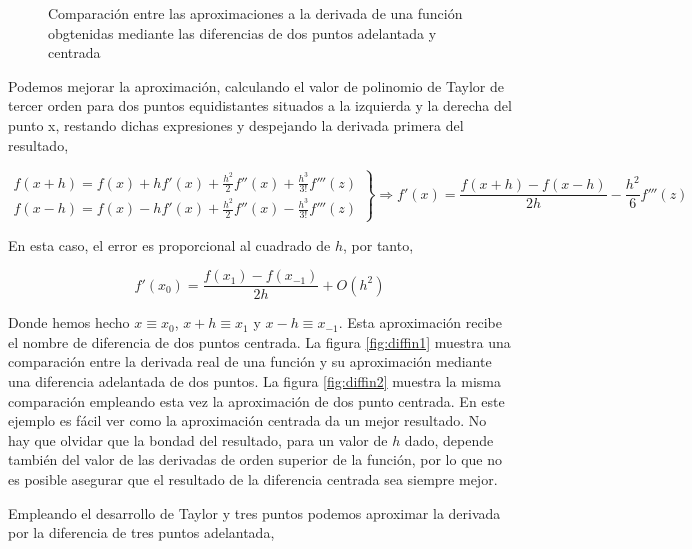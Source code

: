 \begin{figure}[h]
\centering
{} \qquad 
{}
\caption{Comparación entre las aproximaciones a la derivada de una función obgtenidas mediante las diferencias de dos puntos adelantada y centrada} 
\label{fig:diffin}
\end{figure}

Podemos mejorar la aproximación, calculando el valor de polinomio de Taylor de tercer orden para dos puntos equidistantes situados a la izquierda y la derecha del punto x, restando dichas expresiones y despejando la derivada primera del resultado,

\begin{equation*}
\left. \begin{aligned}
f(x+h)=f(x)+hf'(x)+\frac{h^2}{2}f''(x)+\frac{h^3}{3!}f'''(z)\\
f(x-h)=f(x)-hf'(x)+\frac{h^2}{2}f''(x)-\frac{h^3}{3!}f'''(z)
\end{aligned} \right\rbrace \Rightarrow f'(x)=\frac{f(x+h)-f(x-h)}{2h}-\frac{h^2}{6}f'''(z) 
\end{equation*}

En esta caso, el error es proporcional al cuadrado de $h$, por tanto,

\begin{equation*}
f'(x_0)=\frac{f(x_1)-f(x_{-1})}
{2h}+O(h^2)
\end{equation*}

Donde hemos hecho $x\equiv x_0$, $x+h\equiv x_1$ y $x-h\equiv x_{-1}$. Esta aproximación recibe el nombre de diferencia de dos puntos centrada. La figura \ref{fig:diffin1} muestra una comparación entre la derivada real de una función y su aproximación mediante una diferencia adelantada de dos puntos. La figura \ref{fig:diffin2} muestra la misma comparación empleando esta vez la aproximación de dos punto centrada. En este ejemplo es fácil ver como la aproximación centrada da un mejor resultado. No hay que olvidar que  la bondad del resultado, para un valor de $h$ dado, depende también del valor de las derivadas de orden superior de la función, por lo que no es posible asegurar que el resultado de la diferencia centrada sea siempre mejor.

Empleando el desarrollo de Taylor y tres puntos podemos aproximar la derivada por la diferencia de tres puntos adelantada,

